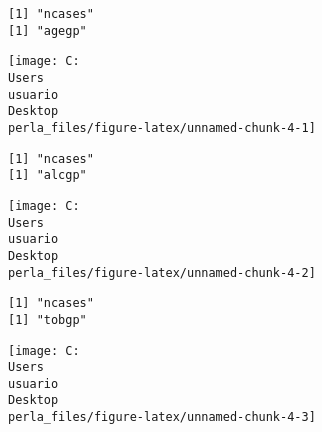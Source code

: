 \documentclass[]{article}
\begin{document}
\begin{verbatim}
[1] "ncases"
[1] "agegp"
\end{verbatim}

\begin{center}\texttt{[image: C:\\Users\\usuario\\Desktop\\perla\_files/figure-latex/unnamed-chunk-4-1]} \end{center}

\begin{verbatim}
[1] "ncases"
[1] "alcgp"
\end{verbatim}

\begin{center}\texttt{[image: C:\\Users\\usuario\\Desktop\\perla\_files/figure-latex/unnamed-chunk-4-2]} \end{center}

\begin{verbatim}
[1] "ncases"
[1] "tobgp"
\end{verbatim}

\begin{center}\texttt{[image: C:\\Users\\usuario\\Desktop\\perla\_files/figure-latex/unnamed-chunk-4-3]} \end{center}
\end{document}
